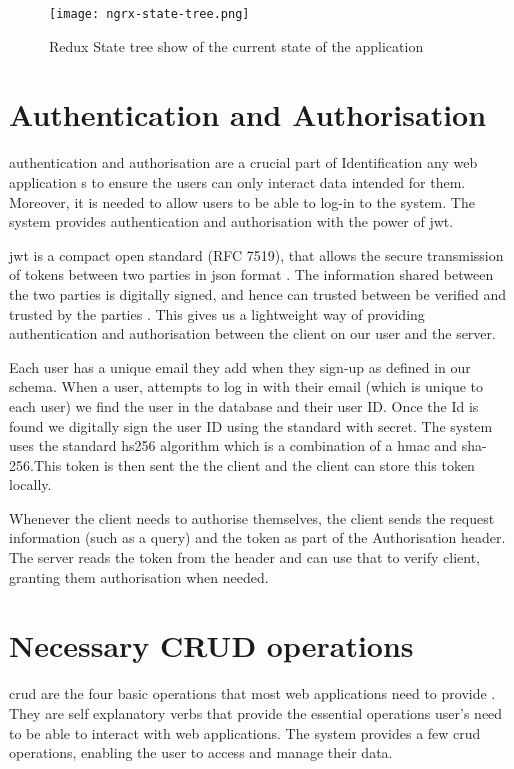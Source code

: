 \begin{figure}[htb!]
    \centering
    \texttt{[image: ngrx-state-tree.png]}
    \caption{Redux State tree show of the current state of the application}
    \label{fig:reduxStateTree}
\end{figure}

\section{Authentication and Authorisation}
\Gls{authentication} and \gls{authorisation}  are a crucial part of Identification any web application s to ensure the users can only interact data intended for them. Moreover, it is needed to allow users to be able to log-in to the system. The system provides authentication and authorisation with the power of \acrfull{jwt}.

\acrshort{jwt} is a compact open standard (RFC 7519), that allows the secure transmission of tokens between two parties in  \acrshort{json} format \cite{jones2015json}. The information shared between the two parties is digitally signed, and hence can trusted between be verified and trusted by the parties \cite{auth02019json}. This gives us a lightweight way of providing authentication and authorisation between the client on our user and the server.

Each user has a unique email they add when they sign-up as defined in our schema. When a user, attempts to log in with their email (which is unique to each user) we find the user in the database and their user ID. Once the Id is found we digitally sign the user ID using the standard with secret. The system uses the standard \acrfull{hs256} algorithm which is a combination of a \acrlong{hmac} and \acrlong{sha-256}.This token is then sent the the client and the client can store this token locally.

Whenever the client needs to authorise themselves, the client sends the request information (such as a query) and the token as part of the Authorisation header. The server reads the token from the header and can use that to verify client, granting them authorisation when needed.

\section{Necessary CRUD operations} \label{sec:ExtraFeatures}
\acrfull{crud} are the four basic operations that most web applications need to provide \cite{codeacademy2019crud}. They are self explanatory verbs that provide the essential operations user's need to be able to interact with web applications. The system provides a few \acrshort{crud} operations, enabling the user to access and manage their data.

